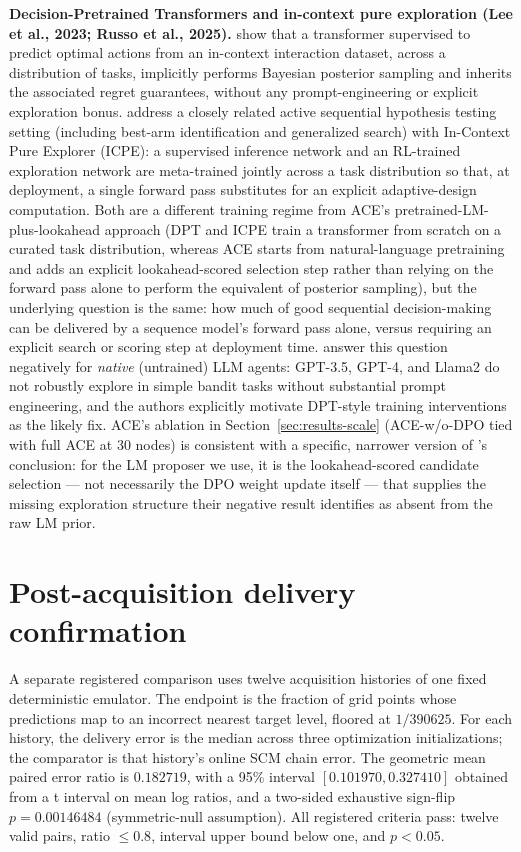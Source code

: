 \documentclass[twoside]{article}
\theoremstyle{plain}
\theoremstyle{definition}
\theoremstyle{remark}
\begin{document}
\textbf{Decision-Pretrained Transformers and in-context pure exploration (Lee et al., 2023; Russo et al., 2025).} \citet{lee2023supervised} show that a transformer supervised to predict optimal actions from an in-context interaction dataset, across a distribution of tasks, implicitly performs Bayesian posterior sampling and inherits the associated regret guarantees, without any prompt-engineering or explicit exploration bonus. \citet{russo2025incontext} address a closely related active sequential hypothesis testing setting (including best-arm identification and generalized search) with In-Context Pure Explorer (ICPE): a supervised inference network and an RL-trained exploration network are meta-trained jointly across a task distribution so that, at deployment, a single forward pass substitutes for an explicit adaptive-design computation. Both are a different training regime from ACE's pretrained-LM-plus-lookahead approach (DPT and ICPE train a transformer from scratch on a curated task distribution, whereas ACE starts from natural-language pretraining and adds an explicit lookahead-scored selection step rather than relying on the forward pass alone to perform the equivalent of posterior sampling), but the underlying question is the same: how much of good sequential decision-making can be delivered by a sequence model's forward pass alone, versus requiring an explicit search or scoring step at deployment time. \citet{krishnamurthy2024explore} answer this question negatively for \emph{native} (untrained) LLM agents: GPT-3.5, GPT-4, and Llama2 do not robustly explore in simple bandit tasks without substantial prompt engineering, and the authors explicitly motivate DPT-style training interventions as the likely fix. ACE's ablation in Section~\ref{sec:results-scale} (ACE-w/o-DPO tied with full ACE at 30 nodes) is consistent with a specific, narrower version of \citet{krishnamurthy2024explore}'s conclusion: for the LM proposer we use, it is the lookahead-scored candidate selection --- not necessarily the DPO weight update itself --- that supplies the missing exploration structure their negative result identifies as absent from the raw LM prior.


\clearpage
\section{Post-acquisition delivery confirmation}
\label{app:delivery-confirmation}
A separate registered comparison uses twelve acquisition histories of one fixed
 deterministic emulator. The endpoint is the fraction of grid points whose
predictions map to an incorrect nearest target level, floored at $1/390625$.
For each history, the delivery error is the median across three optimization
initializations; the comparator is that history's online SCM chain error.
The geometric mean paired error ratio is $0.182719$, with a 95\% interval
$[0.101970,0.327410]$ obtained from a t interval on mean log ratios, and a
 two-sided exhaustive sign-flip $p=0.00146484$ (symmetric-null assumption).
All registered criteria pass: twelve valid pairs, ratio $\leq0.8$, interval
upper bound below one, and $p<0.05$.
\end{document}
